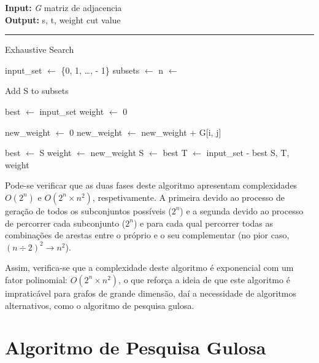 \documentclass[mirror]{revdetua}
\begin{document}
\begin{algorithm}
    \raggedright
    \textbf{Input:} \textit{G} matriz de adjacencia \\
    \textbf{Output:} s, t, weight cut value \\
    \hrule 
    \caption{Exhaustive Search}
    \begin{algorithmic}[1]
        \State input\_set $\gets$ \{0, 1, \ldots,  - 1\}
        \State subsets $\gets$ 
        \State n $\gets$ 
        
            \State Add S to subsets
            \EndFor
        \EndFor
        
        \State best $\gets$ input\_set
        \State weight $\gets$ 0
        
            \State new\_weight $\gets$ 0
                    \State new\_weight $\gets$ new\_weight + G[i, j]
                \EndFor
            \EndFor
            
            \State best $\gets$ S
            \State weight $\gets$ new\_weight
            \EndIf
        \EndFor
        \State S $\gets$ best
        \State T $\gets$ input\_set - best
        \State \Return S, T, weight
    \end{algorithmic}
\end{algorithm}


Pode-se verificar que as duas fases deste algoritmo apresentam complexidades $O(2^n)$ e $O(2^n \times n^2)$, respetivamente. A primeira devido ao processo de geração de todos os subconjuntos possíveis ($2^n$) e a segunda devido ao processo de percorrer cada subconjunto ($2^n$) e para cada qual percorrer todas as combinações de arestas entre o próprio e o seu complementar (no pior caso, $(n \div 2)^2 \rightarrow n^2$).

Assim, verifica-se que a complexidade deste algoritmo é exponencial com um fator polinomial: $O(2^n \times n^2)$, o que reforça a ideia de que este algoritmo é impraticável para grafos de grande dimensão, daí a necessidade de algoritmos alternativos, como o algoritmo de pesquisa gulosa.


\section{Algoritmo de Pesquisa Gulosa}
\end{document}
